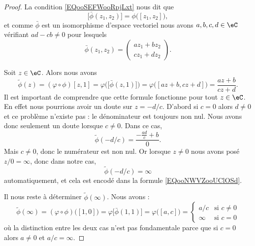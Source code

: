 \begin{proof}
    La condition \eqref{EQooSEFWooRpjLxt} nous dit que
    \begin{equation}
        \big[ \bar \phi(z_1,z_2) \big]=\phi\big( [z_1,z_2] \big),
    \end{equation}
    et comme \( \bar \phi\) est un isomorphisme d'espace vectoriel nous avons \( a,b,c,d\in \eC\) vérifiant \( ad-cb\neq 0\) pour lesquels
    \begin{equation}
        \bar \phi(z_1,z_2)=\begin{pmatrix}
            az_1+bz_2    \\ 
            cz_1+dz_2    
        \end{pmatrix}.
    \end{equation}
    
    Soit \( z\in \eC\). Alors nous avons
    \begin{equation}        \label{EQooNWVZooUClOSd}
        \tilde \phi(z)=(\varphi\circ\phi)[z,1]=\varphi\Big( \big[ \bar\phi(z,1) \big] \Big)=\varphi\big( [az+b,cz+d] \big)=\frac{ az+b }{ cz+d }.
    \end{equation}
    Il est important de comprendre que cette formule fonctionne pour tout \( z\in \eC\). En effet nous pourrions avoir un doute sur \( z=-d/c\). D'abord si \( c=0\) alors \( d\neq 0\) et ce problème n'existe pas : le dénominateur est toujours non nul. Nous avons donc seulement un doute lorsque \( c\neq 0\). Dans ce cas,
    \begin{equation}
        \tilde \phi(-d/c)=\frac{ -\frac{ ad }{ c }+b }{ 0 }.
    \end{equation}
    Mais \( c\neq 0\), donc le numérateur est non nul. Or lorsque \( z\neq 0\) nous avons posé \( z/0=\infty\), donc dans notre cas,
    \begin{equation}
        \tilde \phi(-d/c)=\infty
    \end{equation}
    automatiquement, et cela est encodé dans la formule \eqref{EQooNWVZooUClOSd}.

    Il nous reste à déterminer \( \tilde \phi(\infty)\). Nous avons :
    \begin{equation}
        \tilde \phi(\infty)=(\varphi\circ\phi)\big( [1,0] \big)=\varphi\big[ \bar\phi(1,1) \big]=\varphi\big( [a,c] \big)=\begin{cases}
            a/c    &   \text{si } c\neq 0\\
            \infty    &    \text{si }c=0
        \end{cases}
    \end{equation}
    où la distinction entre les deux cas n'est pas fondamentale parce que si \( c=0\) alors \( a\neq 0\) et \( a/c=\infty\).
\end{proof}

